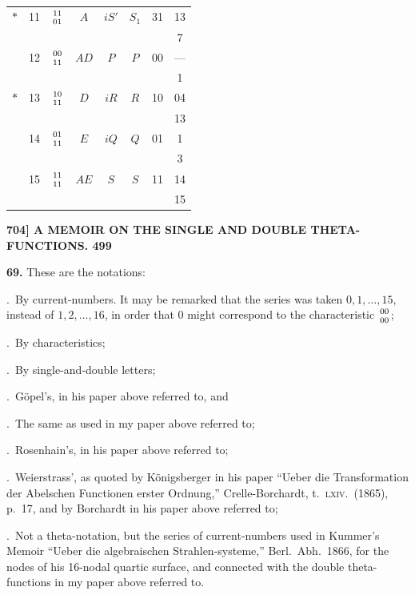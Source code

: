 \documentclass[11pt]{article}
\begin{document}
\begin{center}
\begin{tabular}{|c|c|c|c|c|c|c|c|}
\hline
$*$ & 11 & $\genfrac{}{}{0pt}{}{11}{01}$ & $A$ & $iS'$ & $S_1$ & 31 & 13 \\
 & & & & & & & 7 \\
\hline
 & 12 & $\genfrac{}{}{0pt}{}{00}{11}$ & $AD$ & $P$ & $P$ & 00 & --- \\
 & & & & & & & 1 \\
\hline
$*$ & 13 & $\genfrac{}{}{0pt}{}{10}{11}$ & $D$ & $iR$ & $R$ & 10 & 04 \\
 & & & & & & & 13 \\
\hline
 & 14 & $\genfrac{}{}{0pt}{}{01}{11}$ & $E$ & $iQ$ & $Q$ & 01 & 1 \\
 & & & & & & & 3 \\
\hline
 & 15 & $\genfrac{}{}{0pt}{}{11}{11}$ & $AE$ & $S$ & $S$ & 11 & 14 \\
 & & & & & & & 15 \\
\hline
\end{tabular}
\end{center}

\newpage
\noindent\textbf{704] \hfill A MEMOIR ON THE SINGLE AND DOUBLE THETA-FUNCTIONS. \hfill 499}

\medskip
\textbf{69.} These are the notations:

.\ By current-numbers. It may be remarked that the series was taken $0,1,\ldots,15$, instead of $1,2,\ldots,16$, in order that $0$ might correspond to the characteristic $\genfrac{}{}{0pt}{}{00}{00}$;

.\ By characteristics;

.\ By single-and-double letters;

.\ G\"opel's, in his paper above referred to, and

.\ The same as used in my paper above referred to;

.\ Rosenhain's, in his paper above referred to;

.\ Weierstrass', as quoted by K\"onigsberger in his paper ``Ueber die Transformation der Abelschen Functionen erster Ordnung,'' Crelle-Borchardt, t.~\textsc{lxiv}.~(1865), p.~17, and by Borchardt in his paper above referred to;

.\ Not a theta-notation, but the series of current-numbers used in Kummer's Memoir ``Ueber die algebraischen Strahlen-systeme,'' Berl.~Abh.~1866, for the nodes of his 16-nodal quartic surface, and connected with the double theta-functions in my paper above referred to.
\end{document}
